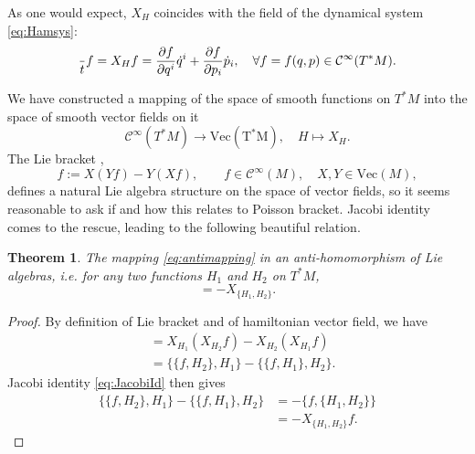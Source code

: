 \documentclass[english,fontsize=11pt,paper=a5,oneside]{scrbook}
\newcommand{\cC}{\mathcal{C}}
\let\d\relax
\DeclareMathOperator{\d}{d}
\newtheorem{theorem}{Theorem}[chapter]
\theoremstyle{definition}
\newenvironment{remark}
  {\pushQED{\qed}\renewcommand{\qedsymbol}{$\lozenge$}\remarkx}
  {\popQED\endremarkx}
\begin{document}
\begin{remark}
    As one would expect, $X_H$ coincides with the field of the dynamical system \eqref{eq:Hamsys}:
    \begin{equation}
        \frac{\d}{\d t} f = X_H f = \frac{\partial f}{\partial q^i}\dot q^i + \frac{\partial f}{\partial p_i} \dot p_i, \quad \forall f=f(q,p)\in\cC^\infty(T^* M).
    \end{equation}     
\end{remark}

We have constructed a mapping of the space of smooth functions on $T^*M$ into the space of smooth vector fields on it
\begin{equation}\label{eq:antimapping}
    \cC^\infty (T^*M) \to \mathrm{Vec(T^* M)}, \quad H \mapsto X_H.
\end{equation}
The Lie bracket \cite{book:lee},
\begin{equation}
    [X,Y] f := X(Y f) - Y(X f), \qquad f\in\cC^\infty(M), \quad X,Y\in\mathrm{Vec}(M),
\end{equation}
defines a natural Lie algebra structure on the space of vector fields, so it seems reasonable to ask if and how this relates to Poisson bracket.
Jacobi identity comes to the rescue, leading to the following beautiful relation.

\begin{theorem}\label{thm:antihom}
    The mapping \eqref{eq:antimapping} in an \emph{anti-homomorphism} of Lie algebras, i.e. for any two functions $H_1$ and $H_2$ on $T^*M$, 
    \begin{equation}
        [X_{H_1}, X_{H_2}] = - X_{\big\{H_1, H_2\big\}}.
    \end{equation}
\end{theorem}
\begin{proof}
    By definition of Lie bracket and of hamiltonian vector field, we have
    \begin{align}
        [X_{H_1}, X_{H_2}] &= X_{H_1}(X_{H_2} f) - X_{H_2}(X_{H_1} f) \\
        &= \big\{\big\{f, H_2\big\}, H_1\big\} - \big\{\big\{f, H_1\big\}, H_2\big\}.
    \end{align}
    Jacobi identity \eqref{eq:JacobiId} then gives
    \begin{align}
        \big\{\big\{f, H_2\big\}, H_1\big\} - \big\{\big\{f, H_1\big\}, H_2\big\} &= - \big\{f,\big\{H_1,H_2\big\}\big\} \\
        &= - X_{\big\{H_1, H_2\big\}} f.
    \end{align}
\end{proof}
\end{document}
